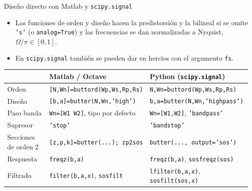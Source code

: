 \documentclass[aspectratio=169,11pt]{beamer}
\begin{document}
\begin{frame}{Diseño directo con Matlab y \texttt{scipy.signal}}
  \begin{itemize}
    \item Las funciones de orden y diseño hacen la predistorsión y la bilineal si se omite \texttt{'s'} (o \texttt{analog=True}) y las frecuencias se dan \alert{normalizadas a Nyquist}, $\Omega/\pi\in[0,1]$.
    \item En \texttt{scipy.signal} también se pueden dar en hercios con el argumento \texttt{fs}.
  \end{itemize}
  \footnotesize
  \renewcommand{\arraystretch}{1.2}
  \begin{center}
    \begin{tabular}{@{}lll@{}}
      \toprule
      & Matlab / Octave & Python (\texttt{scipy.signal})\\\midrule
      Orden & \texttt{[N,Wn]=buttord(Wp,Ws,Rp,Rs)} & \texttt{N,Wn=buttord(Wp,Ws,Rp,Rs)}\\
      Diseño & \texttt{[b,a]=butter(N,Wn,'high')} & \texttt{b,a=butter(N,Wn,'highpass')}\\
      Paso banda & \texttt{Wn=[W1 W2]}, tipo por defecto & \texttt{Wn=[W1,W2]}, \texttt{'bandpass'}\\
      Supresor & \texttt{'stop'} & \texttt{'bandstop'}\\
      Secciones de orden 2 & \texttt{[z,p,k]=butter(...); zp2sos} & \texttt{butter(..., output='sos')}\\
      Respuesta & \texttt{freqz(b,a)} & \texttt{freqz(b,a)}, \texttt{sosfreqz(sos)}\\
      Filtrado & \texttt{filter(b,a,x)}, \texttt{sosfilt} & \texttt{lfilter(b,a,x)}, \texttt{sosfilt(sos,x)}\\\bottomrule
    \end{tabular}
  \end{center}
\end{frame}
\end{document}
